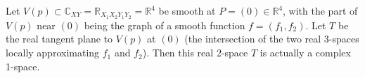 Let $V(p) \subset \mathbb{C}_{XY} = \mathbb{R}_{X_1 X_2 Y_1 Y_2} = \mathbb{R}^4$ be smooth at $P = (0) \in \mathbb{R}^4$, with the part of $V(p)$ near $(0)$ being the graph of a smooth function $f = (f_1, f_2)$. Let $T$ be the real tangent plane to $V(p)$ at $(0)$ (the intersection of the two real 3-spaces locally approximating $f_1$ and $f_2$). Then this real 2-space $T$ is actually a complex 1-space.
